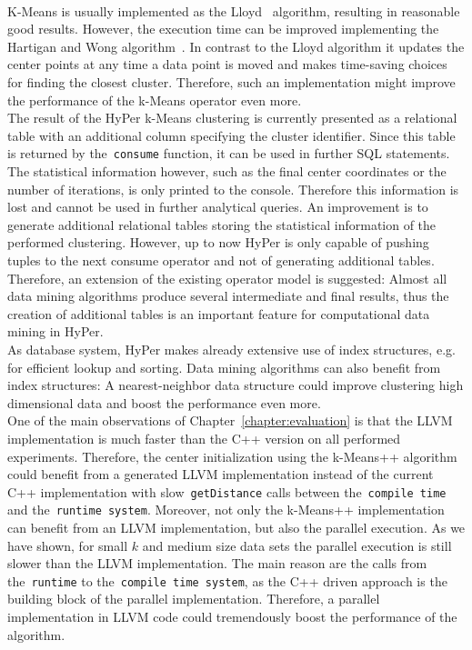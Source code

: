 \\
K-Means is usually implemented as the Lloyd~\parencite{Lloyd82} algorithm, resulting in reasonable good results. However, the execution time can be improved implementing the Hartigan and Wong algorithm~\parencite{hartigan1979algorithm}. In contrast to the Lloyd algorithm it updates the center points at any time a data point is moved and makes time-saving choices for finding the closest cluster. Therefore, such an implementation might improve the performance of the k-Means operator even more.
\\
The result of the HyPer k-Means clustering is currently presented as a relational table with an additional column specifying the cluster identifier. Since this table is returned by the~\texttt{consume} function, it can be used in further SQL statements. The statistical information however, such as the final center coordinates or the number of iterations, is only printed to the console. Therefore this information is lost and cannot be used in further analytical queries. An improvement is to generate additional relational tables storing the statistical information of the performed clustering. However, up to now HyPer is only capable of pushing tuples to the next consume operator and not of generating additional tables. Therefore, an extension of the existing operator model is suggested: Almost all data mining algorithms produce several intermediate and final results, thus the creation of additional tables is an important feature for computational data mining in HyPer.
\\
As database system, HyPer makes already extensive use of index structures, e.g. for efficient lookup and sorting. Data mining algorithms can also benefit from index structures: A nearest-neighbor data structure could improve clustering high dimensional data and boost the performance even more.
\\
One of the main observations of Chapter~\ref{chapter:evaluation} is that the LLVM implementation is much faster than the C++ version on all performed experiments. Therefore, the center initialization using the k-Means++ algorithm could benefit from a generated LLVM implementation instead of the current C++ implementation with slow~\texttt{getDistance} calls between the~\texttt{compile time} and the~\texttt{runtime system}. Moreover, not only the k-Means++ implementation can benefit from an LLVM implementation, but also the parallel execution. As we have shown, for small $k$ and medium size data sets the parallel execution is still slower than the LLVM implementation. The main reason are the calls from the~\texttt{runtime} to the~\texttt{compile time system}, as the C++ driven approach is the building block of the parallel implementation. Therefore, a parallel implementation in LLVM code could tremendously boost the performance of the algorithm. 
